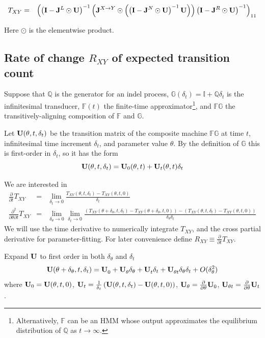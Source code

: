 \documentclass{article}
\begin{document}
\begin{eqnarray*}
T_{XY} & = &
\left(
\left( {\bf I} - {\bf J}^L \odot {\bf U} \right)^{-1}
\left(
     {\bf J}^{X \to Y} \odot
     \left(
     \left( {\bf I} - {\bf J}^N \odot {\bf U} \right)^{-1}
          {\bf U}
     \right)
\right)
\left( {\bf I} - {\bf J}^R \odot {\bf U} \right)^{-1}
\right)_{11}
\end{eqnarray*}

Here $\odot$ is the elementwise product.



\subsection{Rate of change $R_{XY}$ of expected transition count}

Suppose that
$\mathbb{Q}$ is the generator for an indel process,
$\mathbb{G}(\delta_t) = \mathbb{I} + \mathbb{Q} \delta_t$ is the infinitesimal transducer,
$\mathbb{F}(t)$ the finite-time approximator\footnote{Alternatively, $\mathbb{F}$ can be an HMM whose output approximates the equilibrium distribution of $\mathbb{Q}$ as $t \to \infty$.},
and $\mathbb{FG}$ the transitively-aligning composition of $\mathbb{F}$ and $\mathbb{G}$.

Let ${\bf U}(\theta,t,\delta_t)$ be the transition matrix
of the composite machine $\mathbb{FG}$
at time $t$, infinitesimal time increment $\delta_t$, and parameter value $\theta$.
By the definition of $\mathbb{G}$ this is first-order in $\delta_t$, so it has the form
\[
  {\bf U}(\theta,t,\delta_t) = {\bf U}_0(\theta,t) + {\bf U}_t(\theta,t) \delta_t
  \]

We are interested in
\begin{eqnarray*}
\frac{\partial}{\partial t}T_{XY} & = & \lim_{\delta_t \to 0} \frac{T_{XY}(\theta,t,\delta_t) - T_{XY}(\theta,t,0)}{\delta_t} \\
\frac{\partial^2}{\partial \theta \partial t}T_{XY} & = & \lim_{\delta_\theta \to 0} \lim_{\delta_t \to 0}
\frac{\left(T_{XY}(\theta+\delta_\theta,t,\delta_t) - T_{XY}(\theta+\delta_\theta,t,0)\right) - \left(T_{XY}(\theta,t,\delta_t) - T_{XY}(\theta,t,0)\right)}{\delta_\theta \delta_t}
\end{eqnarray*}
We will use the time derivative to numerically integrate $T_{XY}$, and the cross partial derivative for parameter-fitting.
For later convenience define $R_{XY} \equiv \frac{\partial}{\partial t} T_{XY}$.

Expand ${\bf U}$ to first order in both $\delta_\theta$ and $\delta_t$
\newcommand\tthetaexpansion[2]{  {#2}_0^{#1}
  + {#2}_\theta^{#1} \delta_\theta
  + {#2}_t^{#1} \delta_t
  + {#2}_{\theta t}^{#1} \delta_\theta \delta_t }
\newcommand\uexpansion{\tthetaexpansion{}{\bf U}}
\newcommand\vexpansion[1]{\tthetaexpansion{#1}{\bf V}}
\[
  {\bf U}(\theta+\delta_\theta,t,\delta_t) = \uexpansion + O(\delta_\theta^2) %
\]
where ${\bf U}_0={\bf U}(\theta,t,0)$,
${\bf U}_t=\frac{1}{\delta_t} \left( {\bf U}(\theta,t,\delta_t) - {\bf U}(\theta,t,0) \right)$,
${\bf U}_\theta=\frac{\partial}{\partial \theta} {\bf U}_0$,
${\bf U}_{\theta t}=\frac{\partial}{\partial \theta}  {\bf U}_t$.
\end{document}
